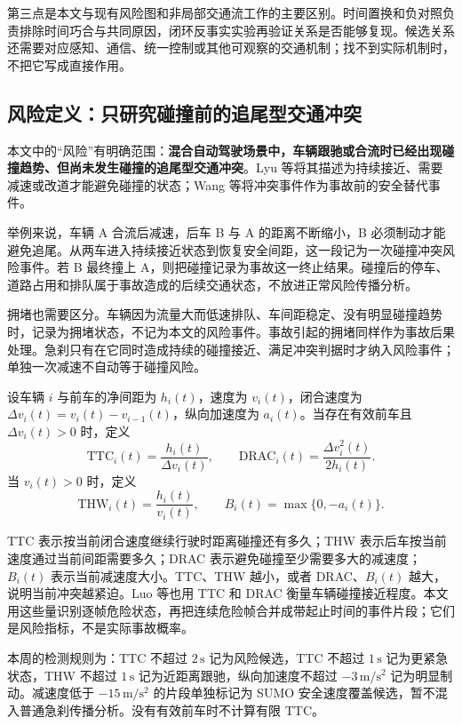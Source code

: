 \documentclass[UTF8,zihao=5,a4paper]{ctexart}
\begin{document}
第三点是本文与现有风险图和非局部交通流工作的主要区别。时间置换和负对照负责排除时间巧合与共同原因，闭环反事实实验再验证关系是否能够复现。候选关系还需要对应感知、通信、统一控制或其他可观察的交通机制；找不到实际机制时，不把它写成直接作用。

\subsection{风险定义：只研究碰撞前的追尾型交通冲突}

本文中的“风险”有明确范围：\textbf{混合自动驾驶场景中，车辆跟驰或合流时已经出现碰撞趋势、但尚未发生碰撞的追尾型交通冲突}。Lyu 等\cite{lyu2025causal}将其描述为持续接近、需要减速或改道才能避免碰撞的状态；Wang 等\cite{wang2024conflict}将冲突事件作为事故前的安全替代事件。

举例来说，车辆 A 合流后减速，后车 B 与 A 的距离不断缩小，B 必须制动才能避免追尾。从两车进入持续接近状态到恢复安全间距，这一段记为一次碰撞冲突风险事件。若 B 最终撞上 A，则把碰撞记录为事故这一终止结果。碰撞后的停车、道路占用和排队属于事故造成的后续交通状态，不放进正常风险传播分析。

拥堵也需要区分。车辆因为流量大而低速排队、车间距稳定、没有明显碰撞趋势时，记录为拥堵状态，不记为本文的风险事件。事故引起的拥堵同样作为事故后果处理。急刹只有在它同时造成持续的碰撞接近、满足冲突判据时才纳入风险事件；单独一次减速不自动等于碰撞风险。

设车辆 $i$ 与前车的净间距为 $h_i(t)$，速度为 $v_i(t)$，闭合速度为 $\Delta v_i(t)=v_i(t)-v_{i-1}(t)$，纵向加速度为 $a_i(t)$。当存在有效前车且 $\Delta v_i(t)>0$ 时，定义
\begin{equation}
\mathrm{TTC}_i(t)=\frac{h_i(t)}{\Delta v_i(t)},\qquad
\mathrm{DRAC}_i(t)=\frac{\Delta v_i^2(t)}{2h_i(t)}.
\end{equation}
当 $v_i(t)>0$ 时，定义
\begin{equation}
\mathrm{THW}_i(t)=\frac{h_i(t)}{v_i(t)},\qquad
B_i(t)=\max\{0,-a_i(t)\}.
\end{equation}

TTC 表示按当前闭合速度继续行驶时距离碰撞还有多久；THW 表示后车按当前速度通过当前间距需要多久；DRAC 表示避免碰撞至少需要多大的减速度；$B_i(t)$ 表示当前减速度大小。TTC、THW 越小，或者 DRAC、$B_i(t)$ 越大，说明当前冲突越紧迫。Luo 等\cite{luo2026crm}也用 TTC 和 DRAC 衡量车辆碰撞接近程度。本文用这些量识别逐帧危险状态，再把连续危险帧合并成带起止时间的事件片段；它们是风险指标，不是实际事故概率。

本周的检测规则为：TTC 不超过 $2\,\mathrm{s}$ 记为风险候选，TTC 不超过 $1\,\mathrm{s}$ 记为更紧急状态，THW 不超过 $1\,\mathrm{s}$ 记为近距离跟驰，纵向加速度不超过 $-3\,\mathrm{m/s^2}$ 记为明显制动。减速度低于 $-15\,\mathrm{m/s^2}$ 的片段单独标记为 SUMO 安全速度覆盖候选，暂不混入普通急刹传播分析。没有有效前车时不计算有限 TTC。
\end{document}
